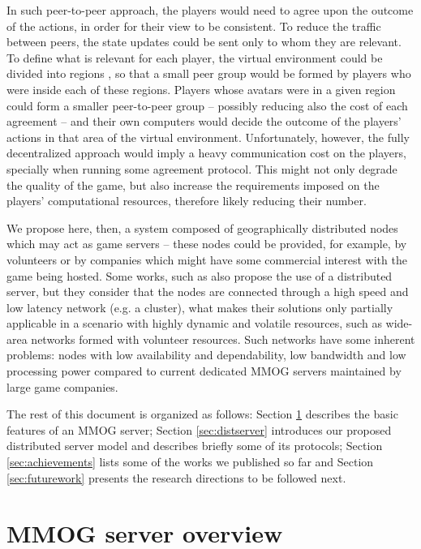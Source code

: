 \documentclass[]{usiinfprospectus}
\begin{document}
In such peer-to-peer approach, the players would need to agree upon the outcome of the actions, in order for their view to be consistent. To reduce the traffic between peers, the state updates could be sent only to whom they are relevant. To define what is relevant for each player, the virtual environment could be divided into regions \cite{schiele2007rpp}, so that a small peer group would be formed by players who were inside each of these regions. Players whose avatars were in a given region could form a smaller peer-to-peer group -- possibly reducing also the cost of each agreement -- and their own computers would decide the outcome of the players' actions in that area of the virtual environment. Unfortunately, however, the fully decentralized approach would imply a heavy communication cost on the players, specially when running some agreement protocol. This might not only degrade the quality of the game, but also increase the requirements imposed on the players' computational resources, therefore likely reducing their number.

We propose here, then, a system composed of geographically distributed nodes which may act as game servers -- these nodes could be provided, for example, by volunteers or by companies which might have some commercial interest with the game being hosted. Some works, such as \cite{assiotis2006dam,ng2002msa, chertov2006olb, lee2003sdl} also propose the use of a distributed server, but they consider that the nodes are connected through a high speed and low latency network (e.g. a cluster), what makes their solutions only partially applicable in a scenario with highly dynamic and volatile resources, such as wide-area networks formed with volunteer resources. Such networks have some inherent problems: nodes with low availability and dependability, low bandwidth and low processing power compared to current dedicated MMOG servers maintained by large game companies.

The rest of this document is organized as follows: Section \ref{sec:mmogserver} describes the basic features of an MMOG server; Section \ref{sec:distserver} introduces our proposed distributed server model and describes briefly some of its protocols; Section \ref{sec:achievements} lists some of the works we published so far and Section \ref{sec:futurework} presents the research directions to be followed next. 

\section{MMOG server overview} \label{sec:mmogserver}
\end{document}
